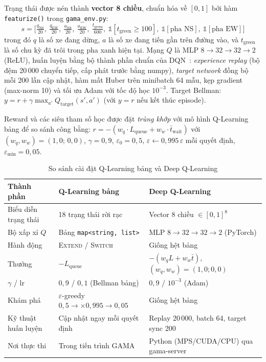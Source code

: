 \documentclass[11pt,a4paper]{article}
\begin{document}
Trạng thái được nén thành \textbf{vector 8 chiều}, chuẩn hóa về $[0,1]$ bởi hàm
\texttt{featurize()} trong \texttt{gama\_env.py}:
\[
s = \Big[\tfrac{q_{\text{NS}}}{20},\ \tfrac{q_{\text{EW}}}{20},\
\tfrac{a_{\text{NS}}}{20},\ \tfrac{a_{\text{EW}}}{20},\
\tfrac{t_{\text{green}}}{600},\ \mathbb{1}[t_{\text{green}}\ge 100],\
\mathbb{1}[\text{pha NS}],\ \mathbb{1}[\text{pha EW}]\Big]
\]
trong đó $q$ là số xe đang dừng, $a$ là số xe đang tiến gần trên đường vào, và
$t_{\text{green}}$ là số chu kỳ đã trôi trong pha xanh hiện tại. Mạng $Q$ là MLP
$8 \rightarrow 32 \rightarrow 32 \rightarrow 2$ (ReLU), huấn luyện bằng bộ thành phần
chuẩn của DQN~\cite{mnih2015}: \emph{experience replay} (bộ đệm 20\,000 chuyển tiếp,
cấp phát trước bằng numpy), \emph{target network} đồng bộ mỗi 200 lần cập nhật, hàm
mất Huber trên minibatch 64 mẫu, kẹp gradient (max-norm 10) và tối ưu Adam với tốc độ
học $10^{-3}$. Target Bellman: $y = r + \gamma \max_{a'} Q_{\text{target}}(s',a')$
(với $y = r$ nếu kết thúc episode).

Reward và các siêu tham số học được đặt \emph{trùng khớp} với mô hình Q-Learning bảng
để so sánh công bằng: $r = -(w_q \cdot L_{\text{queue}} + w_w \cdot \bar{t}_{\text{wait}})$
với $(w_q, w_w) = (1{,}0;\, 0{,}0)$, $\gamma = 0{,}9$, $\varepsilon_0 = 0{,}5$,
$\varepsilon \leftarrow 0{,}995\,\varepsilon$ mỗi quyết định, $\varepsilon_{\min} = 0{,}05$.

\begin{table}[H]
\centering
\footnotesize
\setlength{\tabcolsep}{4.5pt}
\caption{So sánh cài đặt Q-Learning bảng và Deep Q-Learning}
\label{tab:hyperparams}
\begin{tabular}{lll}
\toprule
\textbf{Thành phần} & \textbf{Q-Learning bảng} & \textbf{Deep Q-Learning} \\
\midrule
Biểu diễn trạng thái & 18 trạng thái rời rạc & Vector 8 chiều $\in [0,1]^{8}$ \\
Bộ xấp xỉ $Q$ & Bảng \texttt{map<string, list>} & MLP $8{\to}32{\to}32{\to}2$ (PyTorch) \\
Hành động & \textsc{Extend} / \textsc{Switch} & Giống hệt bảng \\
Thưởng & $-L_{\text{queue}}$ & $-(w_q L + w_w \bar{t})$, $(w_q,w_w){=}(1{,}0;0{,}0)$ \\
$\gamma$ / lr & $0{,}9$ / $0{,}1$ (Bellman bảng) & $0{,}9$ / $10^{-3}$ (Adam) \\
Khám phá & $\varepsilon$-greedy $0{,}5{\to}\times0{,}995{\to}0{,}05$ & Giống hệt bảng \\
Kỹ thuật huấn luyện & Cập nhật ngay mỗi quyết định & Replay 20\,000, batch 64, target sync 200 \\
Nơi thực thi & Trong tiến trình GAMA & Python (MPS/CUDA/CPU) qua gama-server \\
\bottomrule
\end{tabular}
\end{table}
\end{document}
